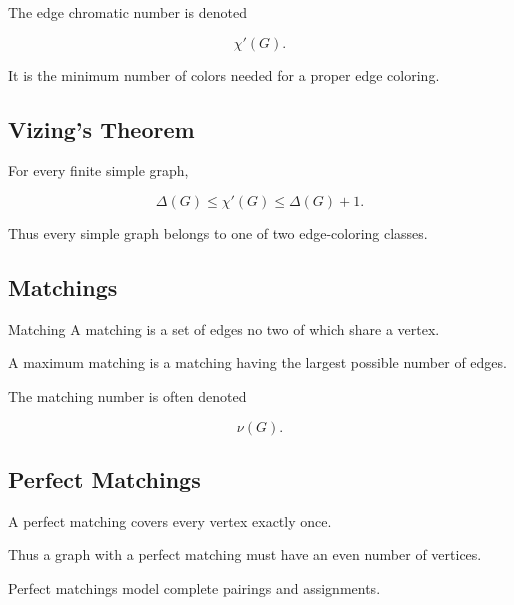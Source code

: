 The edge chromatic number is denoted

\[
\boxed{
\chi'(G).
}
\]

It is the minimum number of colors needed for a proper edge coloring.

\subsection{Vizing's Theorem}
\label{subsec:vizing-theorem}

\begin{theorem}
For every finite simple graph,

\[
\boxed{
\Delta(G)
\leq
\chi'(G)
\leq
\Delta(G)+1.
}
\]
\end{theorem}

Thus every simple graph belongs to one of two edge-coloring classes.

\subsection{Matchings}
\label{subsec:matchings}

\begin{definitionbox}{Matching}
A matching is a set of edges no two of which share a vertex.
\end{definitionbox}

A maximum matching is a matching having the largest possible number of
edges.

The matching number is often denoted

\[
\boxed{
\nu(G).
}
\]

\subsection{Perfect Matchings}
\label{subsec:perfect-matchings}

A perfect matching covers every vertex exactly once.

Thus a graph with a perfect matching must have an even number of
vertices.

Perfect matchings model complete pairings and assignments.

